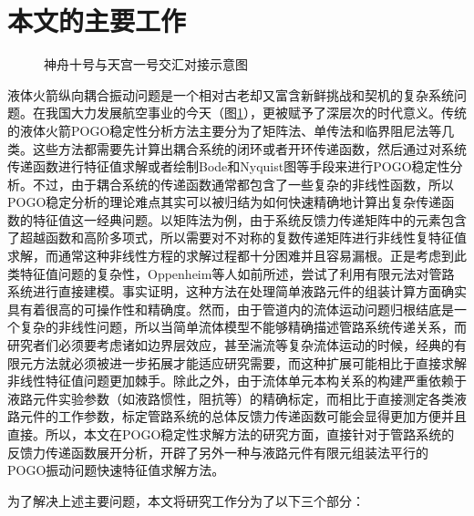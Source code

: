 \section{本文的主要工作}

\begin{figure}[!b]
  \centering
  \caption{神舟十号与天宫一号交汇对接示意图}\label{China-Manned-Flight}
\end{figure}

液体火箭纵向耦合振动问题是一个相对古老却又富含新鲜挑战和契机的复杂系统问题。在我国大力发展航空事业的今天（图\ref{China-Manned-Flight}），更被赋予了深层次的时代意义。传统的液体火箭POGO稳定性分析方法主要分为了矩阵法、单传法和临界阻尼法\cite{Wang-Qizheng:1999}等几类。这些方法都需要先计算出耦合系统的闭环或者开环传递函数，然后通过对系统传递函数进行特征值求解或者绘制Bode和Nyquist图等手段来进行POGO稳定性分析。不过，由于耦合系统的传递函数通常都包含了一些复杂的非线性函数，所以POGO稳定分析的理论难点其实可以被归结为如何快速精确地计算出复杂传递函数的特征值这一经典问题。以矩阵法为例，由于系统反馈力传递矩阵中的元素包含了超越函数和高阶多项式，所以需要对不对称的复数传递矩阵进行非线性复特征值求解，而通常这种非线性方程的求解过程都十分困难并且容易漏根\cite{Dennis:1983, Golub:1996}。正是考虑到此类特征值问题的复杂性，Oppenheim\cite{Oppenheim:1993}等人如前所述，尝试了利用有限元法对管路系统进行直接建模。事实证明，这种方法在处理简单液路元件的组装计算方面确实具有着很高的可操作性和精确度。然而，由于管道内的流体运动问题归根结底是一个复杂的非线性问题\cite{Munson:1990, Paidoussis:1993, Morand:1995}，所以当简单流体模型不能够精确描述管路系统传递关系，而研究者们必须要考虑诸如边界层效应，甚至湍流等复杂流体运动的时候，经典的有限元方法就必须被进一步拓展才能适应研究需要，而这种扩展可能相比于直接求解非线性特征值问题更加棘手。除此之外，由于流体单元本构关系的构建严重依赖于液路元件实验参数（如液路惯性，阻抗等）的精确标定，而相比于直接测定各类液路元件的工作参数，标定管路系统的总体反馈力传递函数可能会显得更加方便并且直接。所以，本文在POGO稳定性求解方法的研究方面，直接针对于管路系统的反馈力传递函数展开分析，开辟了另外一种与液路元件有限元组装法平行的POGO振动问题快速特征值求解方法。

为了解决上述主要问题，本文将研究工作分为了以下三个部分：

